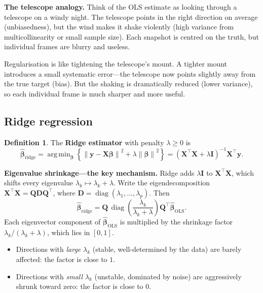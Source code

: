\documentclass[11pt,a4paper]{article}
\theoremstyle{plain}
\theoremstyle{definition}
\newtheorem{definition}[theorem]{Definition}
\newcommand{\bhat}{\hat{\bm{\beta}}}
\newcommand{\bX}{\bm{X}}
\newcommand{\by}{\bm{y}}
\newcommand{\bI}{\bm{I}}
\newcommand{\bQ}{\bm{Q}}
\newcommand{\bD}{\bm{D}}
\newcommand{\norm}[1]{\left\lVert #1 \right\rVert}
\DeclareMathOperator{\diag}{diag}
\DeclareMathOperator*{\argmin}{arg\,min}
\begin{document}
\medskip
\noindent\textbf{The telescope analogy.}
Think of the OLS estimate as looking through a telescope on a windy night.
The telescope points in the right direction on average (unbiasedness),
but the wind makes it shake violently (high variance from
multicollinearity or small sample size).
Each snapshot is centred on the truth, but individual frames are blurry
and useless.

Regularisation is like tightening the telescope's mount.
A tighter mount introduces a small systematic error---the telescope
now points slightly away from the true target (bias).
But the shaking is dramatically reduced (lower variance), so each
individual frame is much sharper and more useful.


\subsection{Ridge regression}

\begin{definition}
The \textbf{Ridge estimator} with penalty $\lambda\ge 0$ is
\[
  \bhat_{\text{ridge}}
  = \argmin_{\bm{\beta}}\left\{
      \norm{\by-\bX\bm{\beta}}^2 + \lambda\norm{\bm{\beta}}^2
    \right\}
  = (\bX^\top\bX + \lambda\bI)^{-1}\bX^\top\by.
\]
\end{definition}

\noindent\textbf{Eigenvalue shrinkage---the key mechanism.}
Ridge adds $\lambda\bI$ to $\bX^\top\bX$, which shifts every eigenvalue
$\lambda_k\mapsto\lambda_k+\lambda$.
Write the eigendecomposition $\bX^\top\bX = \bQ\bD\bQ^\top$, where
$\bD = \diag(\lambda_1,\dots,\lambda_p)$.
Then
\begin{equation}\label{eq:ridge-eigen}
  \bhat_{\text{ridge}}
  = \bQ\,\diag\!\left(\frac{\lambda_k}{\lambda_k+\lambda}\right)\bQ^\top
    \bhat_{\text{OLS}}.
\end{equation}
Each eigenvector component of $\bhat_{\text{OLS}}$ is multiplied by the
shrinkage factor $\lambda_k/(\lambda_k+\lambda)$, which lies in $[0,1]$.
\begin{itemize}[nosep]
  \item Directions with \emph{large} $\lambda_k$ (stable, well-determined
        by the data) are barely affected: the factor is close to $1$.
  \item Directions with \emph{small} $\lambda_k$ (unstable, dominated by
        noise) are aggressively shrunk toward zero: the factor is close
        to $0$.
\end{itemize}
\end{document}
